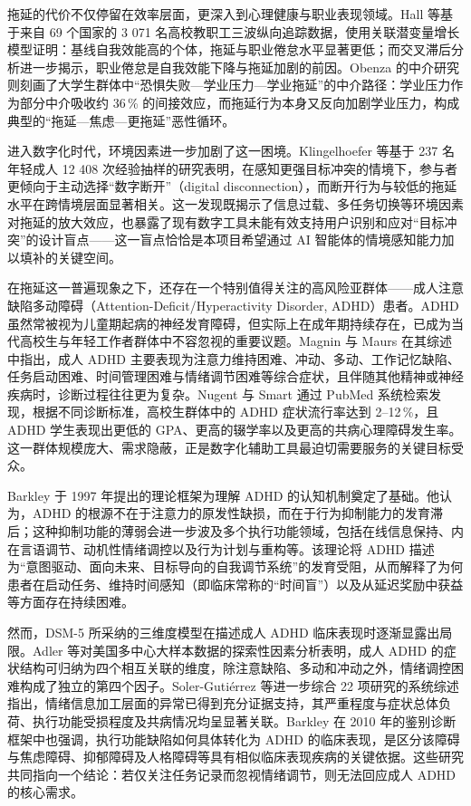 \par 拖延的代价不仅停留在效率层面，更深入到心理健康与职业表现领域。Hall 等基于来自 69 个国家的 3 071 名高校教职工三波纵向追踪数据，使用关联潜变量增长模型证明：基线自我效能高的个体，拖延与职业倦怠水平显著更低；而交叉滞后分析进一步揭示，职业倦怠是自我效能下降与拖延加剧的前因\cite{hall2019self}。Obenza 的中介研究则刻画了大学生群体中``恐惧失败—学业压力—学业拖延''的中介路径：学业压力作为部分中介吸收约 36\,\% 的间接效应，而拖延行为本身又反向加剧学业压力，构成典型的``拖延—焦虑—更拖延''恶性循环\cite{obenza2025academic}。

\par 进入数字化时代，环境因素进一步加剧了这一困境。Klingelhoefer 等基于 237 名年轻成人 12 408 次经验抽样的研究表明，在感知更强目标冲突的情境下，参与者更倾向于主动选择``数字断开''（digital disconnection），而断开行为与较低的拖延水平在跨情境层面显著相关\cite{klingelhoefer2025digital}。这一发现既揭示了信息过载、多任务切换等环境因素对拖延的放大效应，也暴露了现有数字工具未能有效支持用户识别和应对``目标冲突''的设计盲点——这一盲点恰恰是本项目希望通过 AI 智能体的情境感知能力加以填补的关键空间。

\par 在拖延这一普遍现象之下，还存在一个特别值得关注的高风险亚群体——成人注意缺陷多动障碍（Attention-Deficit/Hyperactivity Disorder, ADHD）患者。ADHD 虽然常被视为儿童期起病的神经发育障碍，但实际上在成年期持续存在，已成为当代高校生与年轻工作者群体中不容忽视的重要议题。Magnin 与 Maurs 在其综述中指出，成人 ADHD 主要表现为注意力维持困难、冲动、多动、工作记忆缺陷、任务启动困难、时间管理困难与情绪调节困难等综合症状，且伴随其他精神或神经疾病时，诊断过程往往更为复杂\cite{magnin2017attention}。Nugent 与 Smart 通过 PubMed 系统检索发现，根据不同诊断标准，高校生群体中的 ADHD 症状流行率达到 2--12\,\%，且 ADHD 学生表现出更低的 GPA、更高的辍学率以及更高的共病心理障碍发生率\cite{nugent2014adhd}。这一群体规模庞大、需求隐蔽，正是数字化辅助工具最迫切需要服务的关键目标受众。

\par Barkley 于 1997 年提出的理论框架为理解 ADHD 的认知机制奠定了基础。他认为，ADHD 的根源不在于注意力的原发性缺损，而在于行为抑制能力的发育滞后；这种抑制功能的薄弱会进一步波及多个执行功能领域，包括在线信息保持、内在言语调节、动机性情绪调控以及行为计划与重构等\cite{barkley1997behavioral}。该理论将 ADHD 描述为``意图驱动、面向未来、目标导向的自我调节系统''的发育受阻，从而解释了为何患者在启动任务、维持时间感知（即临床常称的``时间盲''）以及从延迟奖励中获益等方面存在持续困难。

\par 然而，DSM-5 所采纳的三维度模型在描述成人 ADHD 临床表现时逐渐显露出局限。Adler 等对美国多中心大样本数据的探索性因素分析表明，成人 ADHD 的症状结构可归纳为四个相互关联的维度，除注意缺陷、多动和冲动之外，情绪调控困难构成了独立的第四个因子\cite{adler2017structure}。Soler-Gutiérrez 等进一步综合 22 项研究的系统综述指出，情绪信息加工层面的异常已得到充分证据支持，其严重程度与症状总体负荷、执行功能受损程度及共病情况均呈显著关联\cite{solergutierrez2023emotion}。Barkley 在 2010 年的鉴别诊断框架中也强调，执行功能缺陷如何具体转化为 ADHD 的临床表现，是区分该障碍与焦虑障碍、抑郁障碍及人格障碍等具有相似临床表现疾病的关键依据\cite{barkley2010differential}。这些研究共同指向一个结论：若仅关注任务记录而忽视情绪调节，则无法回应成人 ADHD 的核心需求。

